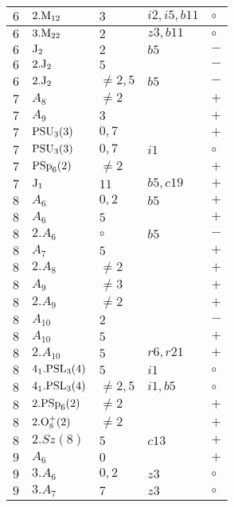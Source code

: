 \documentclass[a4paper, 11pt]{article}
\begin{document}
\begin{longtable}{lllll}
		$6$ & $2.{\rm M}_{12}$ & $3$ & $i2, i5, b11$ & $\circ$ \\ \hline
		$6$ & $3.{\rm M}_{22}$ & $2$ & $z3, b11$ & $\circ$ \\ \hline
		$6$ & ${\rm J}_2$ & $2$ & $b5$ & $-$ \\ \hline
		$6$ & $2.{\rm J}_2$ & $5$ & & $-$ \\ \hline
		$6$ & $2.{\rm J}_2$ & $\neq 2,5$ & $b5$ & $-$ \\ \hline
		$7$ & $A_{8}$ & $\neq 2$ & & $+$ \\ \hline
		$7$ & $A_{9}$ & $3$ & & $+$ \\ \hline
		$7$ & ${\rm PSU}_{3}(3)$ & $0,7$ & & $+$ \\ \hline
		$7$ & ${\rm PSU}_{3}(3)$ & $0,7$ & $i1$ & $\circ$ \\ \hline
		$7$ & ${\rm PSp}_{6}(2)$ & $\neq 2$ & & $+$ \\ \hline
		$7$ & ${\rm J}_1$ & $11$ & $b5, c19$ & $+$ \\ \hline
		$8$ & $A_{6}$ & $0,2$ & $b5$ & $+$ \\ \hline
		$8$ & $A_{6}$ & $5$ & & $+$ \\ \hline
		$8$ & $2.A_{6}$ & $\circ$ & $b5$ & $-$ \\ \hline
		$8$ & $A_{7}$ & $5$ & & $+$ \\ \hline
		$8$ & $2.A_{8}$ & $\neq 2$ & & $+$ \\ \hline
		$8$ & $A_{9}$ & $\neq 3$ & & $+$ \\ \hline
		$8$ & $2.A_{9}$ & $\neq 2$ & & $+$ \\ \hline
		$8$ & $A_{10}$ & $2$ & & $-$ \\ \hline
		$8$ & $A_{10}$ & $5$ & & $+$ \\ \hline
		$8$ & $2.A_{10}$ & $5$ & $r6, r21$ & $+$ \\ \hline
		$8$ & $4_1.{\rm PSL}_{3}(4)$ & $5$ & $i1$ & $\circ$ \\ \hline
		$8$ & $4_1.{\rm PSL}_{3}(4)$ & $\neq 2,5$ & $i1, b5$ & $\circ$ \\ \hline
		$8$ & $2.{\rm PSp}_{6}(2)$ & $\neq 2$ & & $+$ \\ \hline
		$8$ & $2.{\rm O}_{8}^+(2)$ & $\neq 2$ & & $+$ \\ \hline
		$8$ & $2.Sz(8)$ & $5$ & $c13$ & $+$ \\ \hline
		$9$ & $A_{6}$ & $0$ & & $+$ \\ \hline
		$9$ & $3.A_{6}$ & $0, 2$ & $z3$ & $\circ$ \\ \hline
		$9$ & $3.A_{7}$ & $7$ & $z3$ & $\circ$ \\ \hline

\end{longtable}
\end{document}
